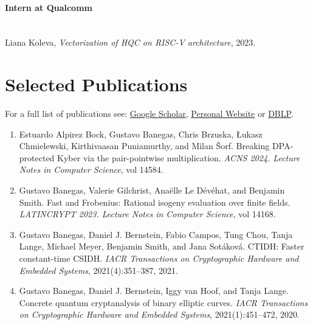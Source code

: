 \paragraph{Intern at Qualcomm} 
~\\
Liana Koleva, \textit{Vectorization of HQC on RISC-V architecture}, 2023. 


\section*{Selected Publications}

For a full list of publications see: \href{https://scholar.google.com/citations?user=0AIDhMwAAAAJ&hl=fr}{Google Scholar}, 
\href{https://cryptme.in/#publications}{Personal Website} or \href{https://dblp.org/pid/150/9441.html}{DBLP}.

\begin{enumerate}\small
\item Estuardo Alpirez Bock, Gustavo Banegas, Chris Brzuska, Łukasz Chmielewski, Kirthivaasan Puniamurthy, and Milan Šorf. Breaking DPA-protected Kyber via the pair-pointwise multiplication. \textit{ACNS 2024. Lecture Notes in Computer Science}, vol 14584.
\item Gustavo Banegas, Valerie Gilchrist, Anaëlle Le Dévéhat, and Benjamin Smith. Fast and Frobenius: Rational isogeny evaluation over finite fields. \textit{LATINCRYPT 2023. Lecture Notes in Computer Science}, vol 14168.
\item Gustavo Banegas, Daniel J. Bernstein, Fabio Campos, Tung Chou, Tanja Lange, Michael Meyer, Benjamin Smith, and Jana Sotáková. CTIDH: Faster constant-time CSIDH. \textit{IACR Transactions on Cryptographic Hardware and Embedded Systems}, 2021(4):351–387, 2021.
\item Gustavo Banegas, Daniel J. Bernstein, Iggy van Hoof, and Tanja Lange. Concrete quantum cryptanalysis of binary elliptic curves. \textit{IACR Transactions on Cryptographic Hardware and Embedded Systems}, 2021(1):451–472, 2020.

\end{enumerate}
